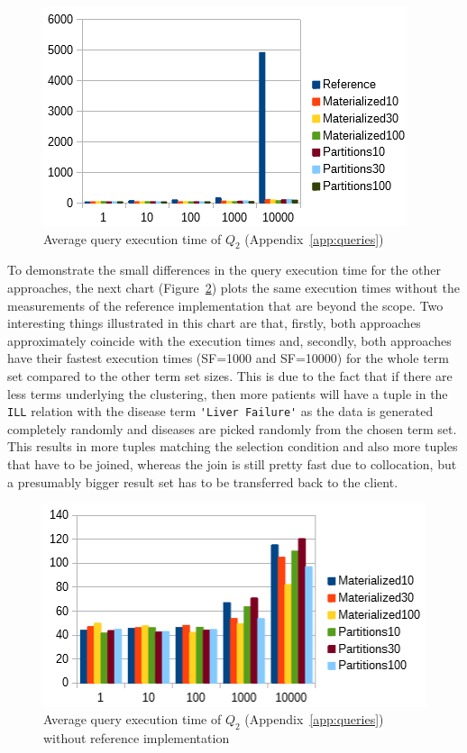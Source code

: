 \begin{figure}[h]
    \centering
    \includegraphics[scale=0.9]{charts/Query2.png}
    \caption{Average query execution time of $Q_2$ (Appendix~\ref{app:queries})}
    \label{fig:query2}
\end{figure}

To demonstrate the small differences in the query execution time for the other approaches, the next chart (Figure~\ref{fig:query2withoutref}) plots the same
execution times without the measurements of the reference implementation that are beyond the scope. Two interesting things illustrated in this chart are that,
firstly, both approaches approximately coincide with the execution times and, secondly, both approaches have their fastest execution times (SF=1000 and
SF=10000) for the whole term set compared to the other term set sizes. This is due to the fact that if there are less terms underlying the clustering, then 
more patients will have a tuple in the \verb!ILL! relation with the disease term \verb!'Liver Failure'! as the data is generated completely randomly and
diseases are picked randomly from the chosen term set. This results in more tuples matching the selection condition and also more tuples that have to be joined,
whereas the join is still pretty fast due to collocation, but a presumably bigger result set has to be transferred back to the client.

\begin{figure}[h]
    \centering
    \includegraphics[scale=0.9]{charts/Query2WithoutReference.png}
    \caption{Average query execution time of $Q_2$ (Appendix~\ref{app:queries}) without reference implementation}
    \label{fig:query2withoutref}
\end{figure}


